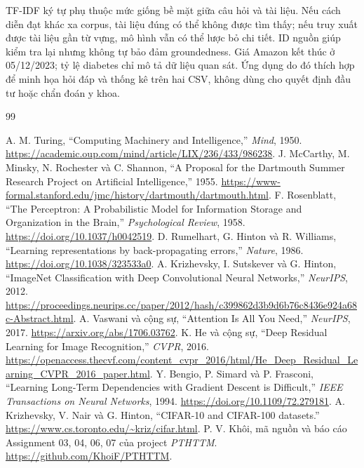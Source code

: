 \documentclass[12pt,a4paper]{report}
\begin{document}
TF-IDF ký tự phụ thuộc mức giống bề mặt giữa câu hỏi và tài liệu. Nếu cách diễn đạt khác xa
corpus, tài liệu đúng có thể không được tìm thấy; nếu truy xuất được tài liệu gần từ vựng,
mô hình vẫn có thể lược bỏ chi tiết. ID nguồn giúp kiểm tra lại nhưng không tự bảo đảm
groundedness. Giá Amazon kết thúc ở 05/12/2023; tỷ lệ diabetes chỉ mô tả dữ liệu quan sát.
Ứng dụng do đó thích hợp để minh họa hỏi đáp và thống kê trên hai CSV, không dùng cho quyết định
đầu tư hoặc chẩn đoán y khoa.

\clearpage
\endgroup
\hypersetup{linkcolor=blue!70!black,urlcolor=blue!70!black,citecolor=blue!70!black}

\clearpage
\begin{thebibliography}{99}
 A. M. Turing, ``Computing Machinery and Intelligence,'' \textit{Mind}, 1950. \url{https://academic.oup.com/mind/article/LIX/236/433/986238}.
 J. McCarthy, M. Minsky, N. Rochester và C. Shannon, ``A Proposal for the Dartmouth Summer Research Project on Artificial Intelligence,'' 1955. \url{https://www-formal.stanford.edu/jmc/history/dartmouth/dartmouth.html}.
 F. Rosenblatt, ``The Perceptron: A Probabilistic Model for Information Storage and Organization in the Brain,'' \textit{Psychological Review}, 1958. \url{https://doi.org/10.1037/h0042519}.
 D. Rumelhart, G. Hinton và R. Williams, ``Learning representations by back-propagating errors,'' \textit{Nature}, 1986. \url{https://doi.org/10.1038/323533a0}.
 A. Krizhevsky, I. Sutskever và G. Hinton, ``ImageNet Classification with Deep Convolutional Neural Networks,'' \textit{NeurIPS}, 2012. \url{https://proceedings.neurips.cc/paper/2012/hash/c399862d3b9d6b76c8436e924a68c-Abstract.html}.
 A. Vaswani và cộng sự, ``Attention Is All You Need,'' \textit{NeurIPS}, 2017. \url{https://arxiv.org/abs/1706.03762}.
 K. He và cộng sự, ``Deep Residual Learning for Image Recognition,'' \textit{CVPR}, 2016. \url{https://openaccess.thecvf.com/content_cvpr_2016/html/He_Deep_Residual_Learning_CVPR_2016_paper.html}.
 Y. Bengio, P. Simard và P. Frasconi, ``Learning Long-Term Dependencies with Gradient Descent is Difficult,'' \textit{IEEE Transactions on Neural Networks}, 1994. \url{https://doi.org/10.1109/72.279181}.
 A. Krizhevsky, V. Nair và G. Hinton, ``CIFAR-10 and CIFAR-100 datasets.'' \url{https://www.cs.toronto.edu/~kriz/cifar.html}.
 P. V. Khôi, mã nguồn và báo cáo Assignment 03, 04, 06, 07 của project \textit{PTHTTM}. \url{https://github.com/KhoiF/PTHTTM}.


\end{thebibliography}
\end{document}
